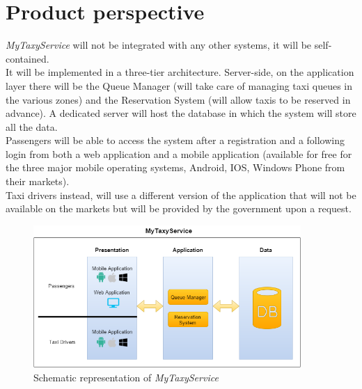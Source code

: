 \section{Product perspective}
\textit{MyTaxyService} will not be integrated with any other systems, it will be self-contained.\\
It will be implemented in a three-tier architecture. Server-side, on the application layer there will be the Queue Manager (will take care of managing taxi queues in the various zones) and the Reservation System (will allow taxis to be reserved in advance). A dedicated server will host the database in which the system will store all the data.\\
Passengers will be able to access the system after a registration and a following login from both a web application and a mobile application (available for free for the three major mobile operating systems, Android, IOS, Windows Phone from their markets).\\
Taxi drivers instead, will use a different version of the application that will not be available on the markets but will be provided by the government upon a request.

\begin{figure}[h]
	\centering
	\includegraphics[width=4in]{Images/system_diagram}
	\caption{Schematic representation of \textit{MyTaxyService}}
\end{figure}
